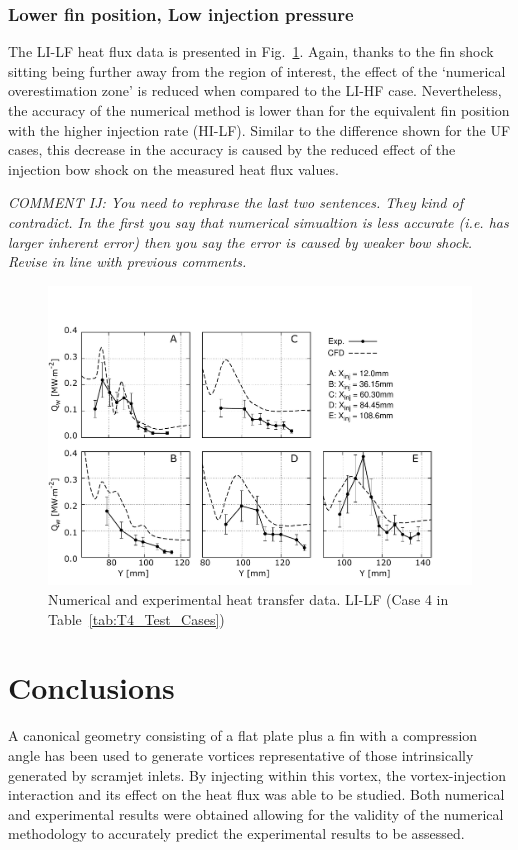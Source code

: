 \documentclass{AIAA}
\begin{document}
\subsubsection{Lower fin position, Low injection pressure}
 
The LI-LF heat flux data is presented in Fig.~\ref{fig:HeatFluxLPLILF}.
Again, thanks to the fin shock sitting being further away from the region of interest, the effect of the `numerical overestimation zone' is reduced when compared to the LI-HF case.
Nevertheless, the accuracy of the numerical method is lower than for the equivalent fin position with the higher injection rate (HI-LF).
Similar to the difference shown for the UF cases, this decrease in the accuracy is caused by the reduced effect of the injection bow shock on the measured heat flux values.

{\it COMMENT IJ: You need to rephrase the last two sentences. They kind of contradict. In the first you say that numerical simualtion is less accurate (i.e. has larger inherent error) then you say the error is caused by weaker bow shock.\\
Revise in line with previous comments.} 


%
\begin{figure}[!h]
\center
\includegraphics[trim = 0mm 3mm 25mm 25mm, clip, width=0.60\columnwidth,valign=t,fbox]{Figures/Data/LP_LI_LF/GNUP_CFD_GaugesLines_Multi.pdf}
\caption{Numerical and experimental heat transfer data. LI-LF (Case 4 in Table~\ref{tab:T4_Test_Cases})}
\label{fig:HeatFluxLPLILF}
\end{figure} 


\section{Conclusions}

A canonical geometry consisting of a flat plate plus a fin with a compression angle has been used to generate vortices representative of those intrinsically generated by scramjet inlets.
By injecting within this vortex, the vortex-injection interaction and its effect on the heat flux was able to be studied.
Both numerical and experimental results were obtained allowing for the validity of the numerical methodology to accurately predict the experimental results to be assessed.
\end{document}
